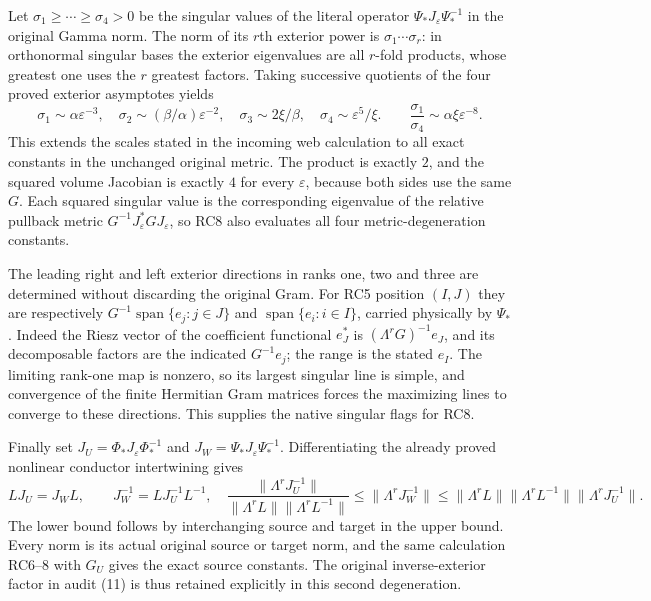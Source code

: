 \documentclass[11pt]{article}
\begin{document}
Let $\sigma_1\ge\cdots\ge\sigma_4>0$ be the singular values of
the literal operator $\Psi_*J_\varepsilon\Psi_*^{-1}$ in the
original Gamma norm. The norm of its $r$th exterior power is
$\sigma_1\cdots\sigma_r$: in orthonormal singular bases the
exterior eigenvalues are all $r$-fold products, whose greatest
one uses the $r$ greatest factors. Taking successive quotients
of the four proved exterior asymptotes yields
\[
 \boxed{
 \sigma_1\sim\alpha\varepsilon^{-3},\quad
 \sigma_2\sim(\beta/\alpha)\varepsilon^{-2},\quad
 \sigma_3\sim2\xi/\beta,\quad
 \sigma_4\sim\varepsilon^5/\xi.}
 \qquad
 \frac{\sigma_1}{\sigma_4}\sim\alpha\xi\varepsilon^{-8}.
 \tag{RC8}
\]
This extends the scales stated in the incoming web calculation to
all exact constants in the unchanged original metric. The product
is exactly $2$, and the squared volume Jacobian is exactly $4$
for every $\varepsilon$, because both sides use the same $G$.
Each squared singular value is the corresponding eigenvalue of
the relative pullback metric $G^{-1}J_\varepsilon^*GJ_\varepsilon$,
so RC8 also evaluates all four metric-degeneration constants.

The leading right and left exterior directions in ranks one,
two and three are determined without discarding the original
Gram. For RC5 position $(I,J)$ they are respectively
$G^{-1}\operatorname{span}\{e_j:j\in J\}$ and
$\operatorname{span}\{e_i:i\in I\}$, carried physically by
$\Psi_*$. Indeed the Riesz vector of the coefficient functional
$e_J^*$ is $(\Lambda^rG)^{-1}e_J$, and its decomposable factors
are the indicated $G^{-1}e_j$; the range is the stated $e_I$.
The limiting rank-one map is nonzero, so its largest singular
line is simple, and convergence of the finite Hermitian Gram
matrices forces the maximizing lines to converge to these
directions. This supplies the native singular flags for RC8.

Finally set $J_U=\Phi_*J_\varepsilon\Phi_*^{-1}$ and
$J_W=\Psi_*J_\varepsilon\Psi_*^{-1}$. Differentiating the already
proved nonlinear conductor intertwining gives
\[
 LJ_U=J_WL,\qquad
 J_W^{-1}=LJ_U^{-1}L^{-1},\quad
 \frac{\|\Lambda^rJ_U^{-1}\|}
      {\|\Lambda^rL\|\|\Lambda^rL^{-1}\|}
 \le\|\Lambda^rJ_W^{-1}\|
 \le\|\Lambda^rL\|\|\Lambda^rL^{-1}\|
                       \|\Lambda^rJ_U^{-1}\|. \tag{RC9}
\]
The lower bound follows by interchanging source and target in the
upper bound. Every norm is its actual original source or target
norm, and the same calculation RC6--8 with $G_U$ gives the exact
source constants. The original inverse-exterior factor in audit
(11) is thus retained explicitly in this second degeneration.
\end{document}
